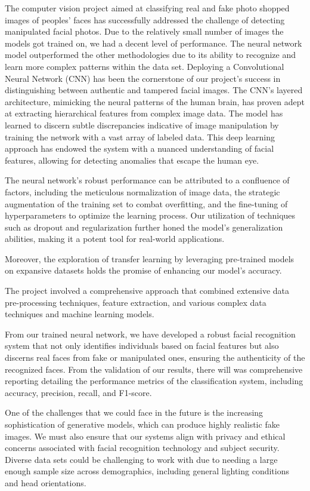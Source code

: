 \documentclass{article}
\begin{document}
\begin{titlepage}
\begin{itemize}
 The computer vision project aimed at classifying real and fake photo shopped images of peoples’ faces
has successfully addressed the challenge of detecting manipulated facial photos. Due to the relatively
small number of images the models got trained on, we had a decent level of performance. The neural
network model outperformed the other methodologies due to its ability to recognize and learn more
complex patterns within the data set. Deploying a Convolutional Neural Network (CNN) has been the cornerstone of our project's success in distinguishing between authentic and tampered facial images. The CNN's layered architecture, mimicking the neural patterns of the human brain, has proven adept at extracting hierarchical features from complex image data. The model has learned to discern subtle discrepancies indicative of image manipulation by training the network with a vast array of labeled data. This deep learning approach has endowed the system with a nuanced understanding of facial features, allowing for detecting anomalies that escape the human eye.

The neural network's robust performance can be attributed to a confluence of factors, including the meticulous normalization of image data, the strategic augmentation of the training set to combat overfitting, and the fine-tuning of hyperparameters to optimize the learning process. Our utilization of techniques such as dropout and regularization further honed the model's generalization abilities, making it a potent tool for real-world applications.

Moreover, the exploration of transfer learning by leveraging pre-trained models on expansive datasets holds the promise of enhancing our model's accuracy.

The project involved a comprehensive approach that combined
extensive data pre-processing techniques, feature extraction, and various complex data techniques and
machine learning models.


From our trained neural network, we have developed a robust facial recognition system that not only
identifies individuals based on facial features but also discerns real faces from fake or manipulated
ones, ensuring the authenticity of the recognized faces. From the validation of our results, there will
was comprehensive reporting detailing the performance metrics of the classification system, including
accuracy, precision, recall, and F1-score.


One of the challenges that we could face in the future is the increasing sophistication of generative models,
which can produce highly realistic fake images. We must also ensure that our systems align with privacy
and ethical concerns associated with facial recognition technology and subject security. Diverse data
sets could be challenging to work with due to needing a large enough sample size across demographics,
including general lighting conditions and head orientations.


\end{itemize}
\end{titlepage}
\end{document}
